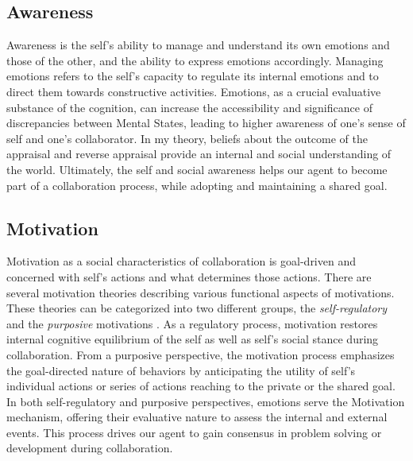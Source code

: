 \documentclass[letterpaper]{article}
\begin{document}
\subsection{Awareness} Awareness is the self's ability to manage and understand
its own emotions and those of the other, and the ability to express emotions
accordingly. Managing emotions refers to the self's capacity to regulate its
internal emotions and to direct them towards constructive activities. Emotions,
as a crucial evaluative substance of the cognition, can increase the
accessibility and significance of discrepancies between Mental States, leading
to higher awareness of one's sense of self and one's collaborator. In my theory,
beliefs about the outcome of the appraisal and reverse appraisal
\cite{gratch:reverse-appraisal} provide an internal and social understanding of
the world. Ultimately, the self and social awareness helps our agent to become
part of a collaboration process, while adopting and maintaining a shared goal.

\subsection{Motivation} Motivation as a social characteristics of collaboration
is goal-driven and concerned with self's actions and what determines those
actions. There are several motivation theories describing various functional
aspects of motivations. These theories can be categorized into two different
groups, the \textit{self-regulatory} and the \textit{purposive} motivations
\cite{graham:motivation}. As a regulatory process, motivation restores internal
cognitive equilibrium of the self as well as self's social stance during
collaboration. From a purposive perspective, the motivation process emphasizes
the goal-directed nature of behaviors by anticipating the utility of self's
individual actions or series of actions reaching to the private or the shared
goal. In both self-regulatory and purposive perspectives, emotions serve the
Motivation mechanism, offering their evaluative nature to assess the internal
and external events. This process drives our agent to gain consensus in problem
solving or development during collaboration.
\end{document}
